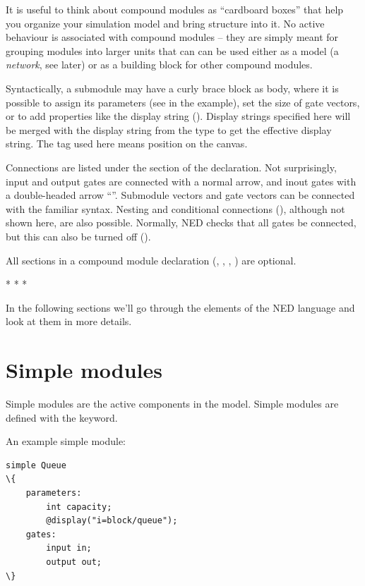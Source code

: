 It is useful to think about compound modules as ``cardboard boxes''
that help you organize your simulation model and bring structure into
it. No active behaviour is associated with compound modules -- they
are simply meant for grouping modules into larger units that can
can be used either as a model (a \textit{network}, see later)
or as a building block for other compound modules.

Syntactically, a submodule may have a curly brace block as body, where
it is possible to assign its parameters (see  in the example),
set the size of gate vectors, or to add properties like the display string
(). Display strings specified here will be merged with the
display string from the type to get the effective display string.
The  tag used here means position on the canvas.

Connections are listed under the  section of the
declaration. Not surprisingly, input and output gates are
connected with a normal arrow, and inout gates with a double-headed
arrow ``\ttt{<-->}''. Submodule vectors and gate vectors can be
connected with the familiar  syntax. Nesting and conditional
connections (), although not shown here, are also possible.
Normally, NED checks that all gates be connected, but this can also
be turned off ().

All sections in a compound module declaration (,
, , ) are optional.

\bigskip
\begin{center}* * *\end{center}
\bigskip

In the following sections we'll go through the elements of the NED
language and look at them in more details.



\section{Simple modules}

Simple modules are the active components in the model.
Simple modules are defined with the  keyword.

An example simple module:

\begin{Verbatim}[commandchars=\\\{\}]
simple Queue
\{
    parameters:
        int capacity;
        @display("i=block/queue");
    gates:
        input in;
        output out;
\}
\end{Verbatim}

